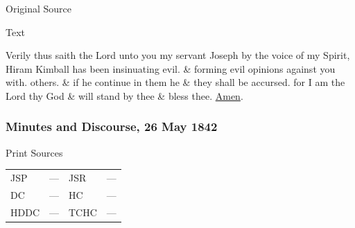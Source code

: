 			
			\begin{description}
				\item[Original Source]
			\end{description}
			
			
			\begin{description}
				\item[Text]
			\end{description}
			
				Verily thus saith the Lord unto you my servant Joseph by the voice of my Spirit, Hiram Kimball has been insinuating evil. \& forming evil opinions against you with. others. \& if he continue in them he \& they shall be accursed. for I am the Lord thy God \& will stand by thee \& bless thee. \uline{Amen}.
				
		\subsubsection{Minutes and Discourse, 26 May 1842}
			\label{EMS-1842-JS-26-MAY-1842}
			
			\begin{description}
				\item[Print Sources]
			\end{description}

			\begin{tabular}{p{0.5in}p{1in}p{0.5in}p{1in}}
				JSP	 	& ---		& JSR 		& --- \\
				DC	 	& ---		& HC 		& --- \\
				HDDC 	& ---		& TCHC 		& --- \\
			\end{tabular}
			
